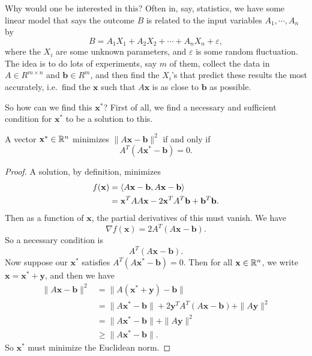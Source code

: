 \documentclass[a4paper]{article}
\begin{document}
Why would one be interested in this? Often in, say, statistics, we have some linear model that says the outcome $B$ is related to the input variables $A_1, \cdots, A_n$ by
\[
  B = A_1 X_1 + A_2 X_2 + \cdots + A_n X_n + \varepsilon,
\]
where the $X_i$ are some unknown parameters, and $\varepsilon$ is some random fluctuation. The idea is to do lots of experiments, say $m$ of them, collect the data in $A \in R^{m \times n}$ and $\mathbf{b} \in R^m$, and then find the $X_i$'s that predict these results the most accurately, i.e.\ find the $\mathbf{x}$ such that $A\mathbf{x}$ is as close to $\mathbf{b}$ as possible.

So how can we find this $\mathbf{x}^*$? First of all, we find a necessary and sufficient condition for $\mathbf{x}^*$ to be a solution to this.
\begin{thm}
  A vector $\mathbf{x}^* \in \mathbb{R}^n$ minimizes $\|A\mathbf{x} - \mathbf{b}\|^2$ if and only if
  \[
    A^T(A\mathbf{x}^* - \mathbf{b}) = 0.
  \]
\end{thm}

\begin{proof}
  A solution, by definition, minimizes
  \begin{align*}
    f(\mathbf{x}) &= \langle A\mathbf{x} - \mathbf{b}, A\mathbf{x} - \mathbf{b}\rangle\\
    &= \mathbf{x}^T AA\mathbf{x} - 2\mathbf{x}^T A^T \mathbf{b} + \mathbf{b}^T \mathbf{b}.
  \end{align*}
  Then as a function of $\mathbf{x}$, the partial derivatives of this must vanish. We have
  \[
    \nabla f(\mathbf{x}) = 2A^T(A\mathbf{x} - \mathbf{b}).
  \]
  So a necessary condition is
  \[
    A^T (A\mathbf{x} - \mathbf{b}).
  \]
  Now suppose our $\mathbf{x}^*$ satisfies $A^T (A\mathbf{x}^* - \mathbf{b}) = 0$. Then for all $\mathbf{x} \in \mathbb{R}^n$, we write $\mathbf{x} = \mathbf{x}^* + \mathbf{y}$, and then we have
  \begin{align*}
    \|A\mathbf{x} - \mathbf{b}\|^2 &= \|A(\mathbf{x}^* + \mathbf{y}) - \mathbf{b}\|\\
    &= \|A \mathbf{x}^* - \mathbf{b}\| + 2\mathbf{y}^T A^T (A\mathbf{x} - \mathbf{b}) + \|A\mathbf{y}\|^2\\
    &= \|A \mathbf{x}^* - \mathbf{b}\| + \|A\mathbf{y}\|^2\\
    &\geq \|A \mathbf{x}^* - \mathbf{b}\|.
  \end{align*}
  So $\mathbf{x}^*$ must minimize the Euclidean norm.
\end{proof}
\end{document}
